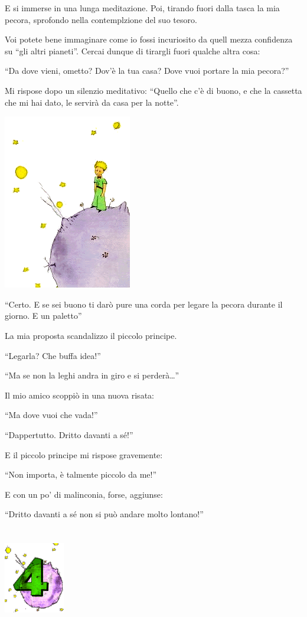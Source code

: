 \documentclass[11pt]{scrbook}
\begin{document}
E si immerse in una lunga meditazione. Poi, tirando fuori dalla tasca la mia pecora, sprofondo nella contemplzione del suo tesoro.

Voi potete bene immaginare come io fossi incuriosito da quell mezza confidenza su ``gli altri pianeti''. Cercai dunque di tirargli fuori qualche altra cosa:

``Da dove vieni, ometto? Dov'è la tua casa? Dove vuoi portare la mia pecora?''

Mi rispose dopo un silenzio meditativo: ``Quello che c'è di buono, e che la cassetta che mi hai dato, le servirà da casa per la notte''.

\begin{center}
\includegraphics{img/estrellas}
\end{center}

``Certo. E se sei buono ti darò pure una corda per legare la pecora durante il giorno. E un paletto''

La mia proposta scandalizzo il piccolo principe.

``Legarla? Che buffa idea!''

``Ma se non la leghi andra in giro e si perderà\ldots{}''

Il mio amico scoppiò in una nuova risata:

``Ma dove vuoi che vada!''

``Dappertutto. Dritto davanti a sé!''

E il piccolo principe mi rispose gravemente:

``Non importa, è talmente piccolo da me!''

E con un po' di malinconia, forse, aggiunse:

``Dritto davanti a sé non si può andare molto lontano!''

\chapter{}
\begin{center}
\includegraphics{img/chapter4}
\end{center}
\end{document}
